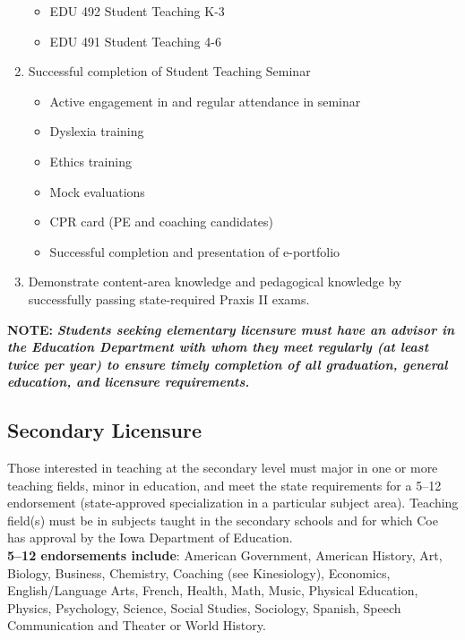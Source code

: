 \documentclass[
  letterpaper,
]{scrbook}
\providecommand{\tightlist}{%
  \setlength{\itemsep}{0pt}\setlength{\parskip}{0pt}}
\begin{document}
\begin{enumerate}
  \begin{itemize}
  \tightlist
  \item
    EDU 492 Student Teaching K-3
  \item
    EDU 491 Student Teaching 4-6
  \end{itemize}
\item
  Successful completion of Student Teaching Seminar

  \begin{itemize}
  \tightlist
  \item
    Active engagement in and regular attendance in seminar
  \item
    Dyslexia training
  \item
    Ethics training
  \item
    Mock evaluations
  \item
    CPR card (PE and coaching candidates)
  \item
    Successful completion and presentation of e-portfolio
  \end{itemize}
\item
  Demonstrate content-area knowledge and pedagogical knowledge by
  successfully passing state-required Praxis II exams.
\end{enumerate}

\textbf{NOTE:} \textbf{\emph{Students seeking elementary licensure must
have an advisor in the Education Department with whom they meet
regularly (at least twice per year) to ensure timely completion of all
graduation, general education, and licensure requirements.}}

\subsection{Secondary Licensure}\label{secondary-licensure}

Those interested in teaching at the secondary level must major in one or
more teaching fields, minor in education, and meet the state
requirements for a 5--12 endorsement (state-approved specialization in a
particular subject area). Teaching field(s) must be in subjects taught
in the secondary schools and for which Coe has approval by the Iowa
Department of Education.\\
\textbf{5--12 endorsements include}: American Government, American
History, Art, Biology, Business, Chemistry, Coaching (see Kinesiology),
Economics, English/Language Arts, French, Health, Math, Music, Physical
Education, Physics, Psychology, Science, Social Studies, Sociology,
Spanish, Speech Communication and Theater or World History.
\end{document}
